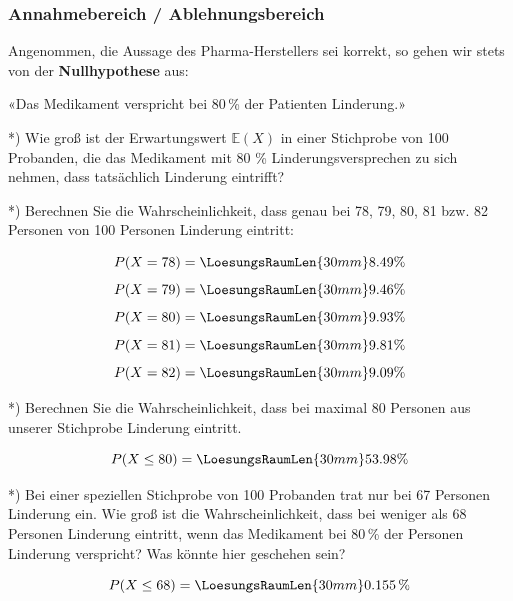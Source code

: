 

\subsubsection{Annahmebereich /
  Ablehnungsbereich}

Angenommen, die Aussage des Pharma-Herstellers sei korrekt, so gehen
wir stets von der \textbf{Nullhypothese} aus:

«Das Medikament verspricht bei 80\,\% der Patienten Linderung.»

*) Wie groß ist der Erwartungswert $\mathbb{E}(X)$ in einer Stichprobe
von 100 Probanden, die das Medikament mit 80 \% Linderungsversprechen
zu sich nehmen, dass tatsächlich Linderung eintrifft?


*) Berechnen Sie die Wahrscheinlichkeit, dass genau bei 78, 79, 80, 81
bzw. 82 Personen von 100 Personen Linderung eintritt:

$$P(X=78) = \LoesungsRaumLen{30mm}{8.49 \%}$$
$$P(X=79) = \LoesungsRaumLen{30mm}{9.46 \%}$$
$$P(X=80) = \LoesungsRaumLen{30mm}{9.93 \%}$$
$$P(X=81) = \LoesungsRaumLen{30mm}{9.81 \%}$$
$$P(X=82) = \LoesungsRaumLen{30mm}{9.09 \%}$$

\newpage


*) Berechnen Sie die Wahrscheinlichkeit, dass bei maximal 80 Personen
aus unserer Stichprobe Linderung eintritt.

$$P(X \le 80) = \LoesungsRaumLen{30mm}{53.98 \%}$$

*) Bei einer speziellen Stichprobe von 100 Probanden trat nur bei 67
Personen Linderung ein. Wie groß ist die Wahrscheinlichkeit, dass bei
weniger als 68 Personen Linderung eintritt, wenn das Medikament bei
80\,\% der Personen Linderung verspricht? Was könnte hier
geschehen sein?

$$P(X \le 68) = \LoesungsRaumLen{30mm}{0.155\,\%}$$

\newpage



